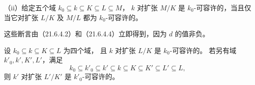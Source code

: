 （ii）给定五个域 $k_0\subseteq k\subseteq K\subseteq L\subseteq M$，
$k$ 对扩张 $M/K$ 是 $k_0$-可容许的，当且仅当它对扩张 $L/K$ 及 $M/L$
都为 $k_0$-可容许的。

这些断言由（21.6.4.2）和（21.6.4.4）立即得到，因为 $d$ 的值非负。

设 $k_0\subseteq k\subseteq K\subseteq L$ 为四个域，
且 $k$ 对扩张 $L/K$ 是 $k_0$-可容许的。
若另有域 $k'_0,k',K',L'$，满足
\[
 k_0\subseteq k'_0\subseteq k'\subseteq k\subseteq K
 \subseteq K'\subseteq L'\subseteq L,
\]
则 $k'$ 对扩张 $L'/K'$ 是 $k'_0$-可容许的。

